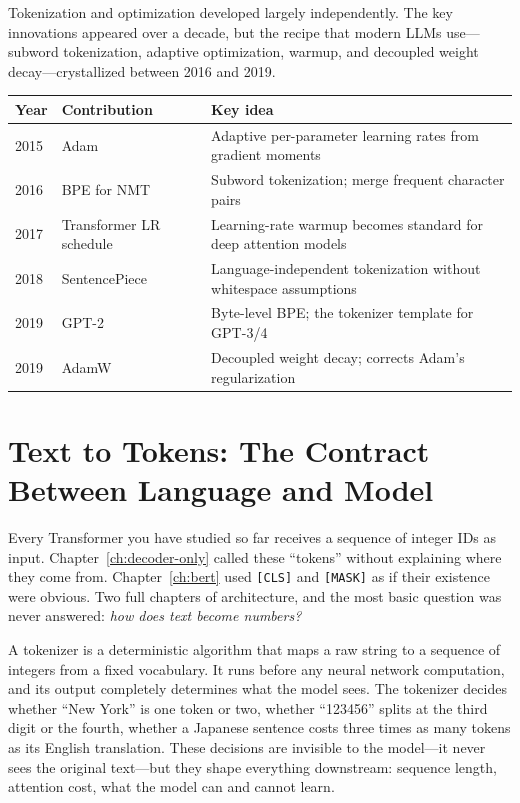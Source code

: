 Tokenization and optimization developed largely independently. The key innovations appeared over a decade, but the recipe that modern LLMs use---subword tokenization, adaptive optimization, warmup, and decoupled weight decay---crystallized between 2016 and 2019.

\begin{center}
\begin{tabularx}{\textwidth}{@{}lp{3.8cm}X@{}}
\toprule
Year & Contribution & Key idea \\
\midrule
2015 & Adam~\cite{kingma2015adam} & Adaptive per-parameter learning rates from gradient moments \\
2016 & BPE for NMT~\cite{sennrich2016bpe} & Subword tokenization; merge frequent character pairs \\
2017 & Transformer LR schedule~\cite{vaswani2017attention} & Learning-rate warmup becomes standard for deep attention models \\
2018 & SentencePiece~\cite{kudo2018sentencepiece} & Language-independent tokenization without whitespace assumptions \\
2019 & GPT-2~\cite{radford2019language} & Byte-level BPE; the tokenizer template for GPT-3/4 \\
2019 & AdamW~\cite{loshchilov2019adamw} & Decoupled weight decay; corrects Adam's regularization \\
\bottomrule
\end{tabularx}
\end{center}


\section{Text to Tokens: The Contract Between Language and Model}

Every Transformer you have studied so far receives a sequence of integer IDs as input. Chapter~\ref{ch:decoder-only} called these ``tokens'' without explaining where they come from. Chapter~\ref{ch:bert} used \texttt{[CLS]} and \texttt{[MASK]} as if their existence were obvious. Two full chapters of architecture, and the most basic question was never answered: \emph{how does text become numbers?}

A tokenizer is a deterministic algorithm that maps a raw string to a sequence of integers from a fixed vocabulary. It runs before any neural network computation, and its output completely determines what the model sees. The tokenizer decides whether ``New York'' is one token or two, whether ``123456'' splits at the third digit or the fourth, whether a Japanese sentence costs three times as many tokens as its English translation. These decisions are invisible to the model---it never sees the original text---but they shape everything downstream: sequence length, attention cost, what the model can and cannot learn.

